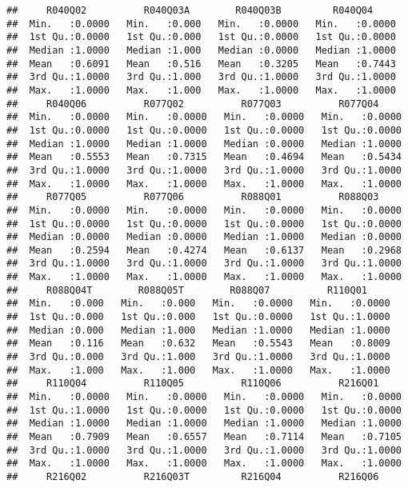 \documentclass[
]{article}
\begin{document}
\begin{verbatim}
##     R040Q02          R040Q03A        R040Q03B         R040Q04      
##  Min.   :0.0000   Min.   :0.000   Min.   :0.0000   Min.   :0.0000  
##  1st Qu.:0.0000   1st Qu.:0.000   1st Qu.:0.0000   1st Qu.:0.0000  
##  Median :1.0000   Median :1.000   Median :0.0000   Median :1.0000  
##  Mean   :0.6091   Mean   :0.516   Mean   :0.3205   Mean   :0.7443  
##  3rd Qu.:1.0000   3rd Qu.:1.000   3rd Qu.:1.0000   3rd Qu.:1.0000  
##  Max.   :1.0000   Max.   :1.000   Max.   :1.0000   Max.   :1.0000  
##     R040Q06          R077Q02          R077Q03          R077Q04      
##  Min.   :0.0000   Min.   :0.0000   Min.   :0.0000   Min.   :0.0000  
##  1st Qu.:0.0000   1st Qu.:0.0000   1st Qu.:0.0000   1st Qu.:0.0000  
##  Median :1.0000   Median :1.0000   Median :0.0000   Median :1.0000  
##  Mean   :0.5553   Mean   :0.7315   Mean   :0.4694   Mean   :0.5434  
##  3rd Qu.:1.0000   3rd Qu.:1.0000   3rd Qu.:1.0000   3rd Qu.:1.0000  
##  Max.   :1.0000   Max.   :1.0000   Max.   :1.0000   Max.   :1.0000  
##     R077Q05          R077Q06          R088Q01          R088Q03      
##  Min.   :0.0000   Min.   :0.0000   Min.   :0.0000   Min.   :0.0000  
##  1st Qu.:0.0000   1st Qu.:0.0000   1st Qu.:0.0000   1st Qu.:0.0000  
##  Median :0.0000   Median :0.0000   Median :1.0000   Median :0.0000  
##  Mean   :0.2594   Mean   :0.4274   Mean   :0.6137   Mean   :0.2968  
##  3rd Qu.:1.0000   3rd Qu.:1.0000   3rd Qu.:1.0000   3rd Qu.:1.0000  
##  Max.   :1.0000   Max.   :1.0000   Max.   :1.0000   Max.   :1.0000  
##     R088Q04T        R088Q05T        R088Q07          R110Q01      
##  Min.   :0.000   Min.   :0.000   Min.   :0.0000   Min.   :0.0000  
##  1st Qu.:0.000   1st Qu.:0.000   1st Qu.:0.0000   1st Qu.:1.0000  
##  Median :0.000   Median :1.000   Median :1.0000   Median :1.0000  
##  Mean   :0.116   Mean   :0.632   Mean   :0.5543   Mean   :0.8009  
##  3rd Qu.:0.000   3rd Qu.:1.000   3rd Qu.:1.0000   3rd Qu.:1.0000  
##  Max.   :1.000   Max.   :1.000   Max.   :1.0000   Max.   :1.0000  
##     R110Q04          R110Q05          R110Q06          R216Q01      
##  Min.   :0.0000   Min.   :0.0000   Min.   :0.0000   Min.   :0.0000  
##  1st Qu.:1.0000   1st Qu.:0.0000   1st Qu.:0.0000   1st Qu.:0.0000  
##  Median :1.0000   Median :1.0000   Median :1.0000   Median :1.0000  
##  Mean   :0.7909   Mean   :0.6557   Mean   :0.7114   Mean   :0.7105  
##  3rd Qu.:1.0000   3rd Qu.:1.0000   3rd Qu.:1.0000   3rd Qu.:1.0000  
##  Max.   :1.0000   Max.   :1.0000   Max.   :1.0000   Max.   :1.0000  
##     R216Q02          R216Q03T         R216Q04          R216Q06      

\end{verbatim}
\end{document}
